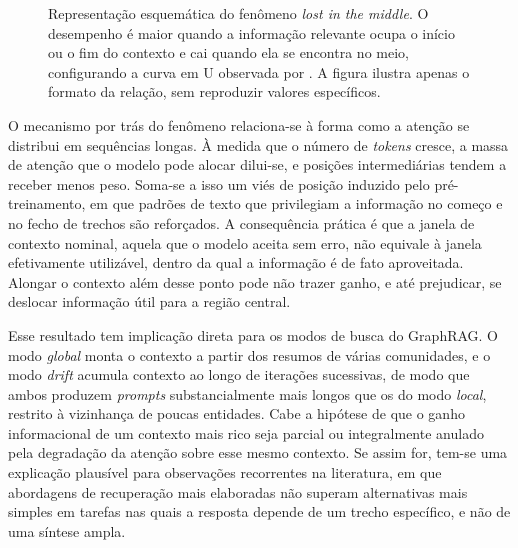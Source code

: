 \begin{figure}[htb]
\centering
{}
\caption{Representação esquemática do fenômeno \textit{lost in the middle}. O desempenho é maior quando a informação relevante ocupa o início ou o fim do contexto e cai quando ela se encontra no meio, configurando a curva em U observada por \citet{liu2024}. A figura ilustra apenas o formato da relação, sem reproduzir valores específicos.}
\label{fig:lost-middle}
\end{figure}

O mecanismo por trás do fenômeno relaciona-se à forma como a atenção se distribui em sequências longas. À medida que o número de \textit{tokens} cresce, a massa de atenção que o modelo pode alocar dilui-se, e posições intermediárias tendem a receber menos peso. Soma-se a isso um viés de posição induzido pelo pré-treinamento, em que padrões de texto que privilegiam a informação no começo e no fecho de trechos são reforçados. A consequência prática é que a janela de contexto nominal, aquela que o modelo aceita sem erro, não equivale à janela efetivamente utilizável, dentro da qual a informação é de fato aproveitada. Alongar o contexto além desse ponto pode não trazer ganho, e até prejudicar, se deslocar informação útil para a região central.

Esse resultado tem implicação direta para os modos de busca do GraphRAG. O modo \textit{global} monta o contexto a partir dos resumos de várias comunidades, e o modo \textit{drift} acumula contexto ao longo de iterações sucessivas, de modo que ambos produzem \textit{prompts} substancialmente mais longos que os do modo \textit{local}, restrito à vizinhança de poucas entidades. Cabe a hipótese de que o ganho informacional de um contexto mais rico seja parcial ou integralmente anulado pela degradação da atenção sobre esse mesmo contexto. Se assim for, tem-se uma explicação plausível para observações recorrentes na literatura, em que abordagens de recuperação mais elaboradas não superam alternativas mais simples em tarefas nas quais a resposta depende de um trecho específico, e não de uma síntese ampla.

